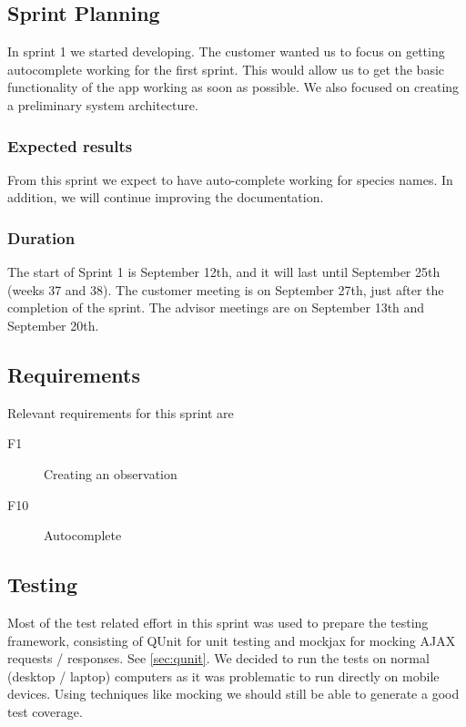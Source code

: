 \subsection{Sprint Planning}

	In sprint 1 we started developing. The customer wanted us to focus on getting autocomplete working for the first sprint. This would allow us to get the basic functionality of the app working as soon as possible. We also focused on creating a preliminary system architecture.

	\subsubsection{Expected results}
  From this sprint we expect to have auto-complete working for species names. In addition, we will continue improving the documentation.
	
	\subsubsection{Duration}
	The start of Sprint 1 is September 12th, and it will last until September 25th (weeks 37 and 38). The customer meeting is on September 27th, just after the completion of the sprint. The advisor meetings are on September 13th and September 20th.
	
\subsection{Requirements}

	Relevant requirements for this sprint are 
  \begin{description}
  \item[F1] Creating an observation
  \item[F10] Autocomplete 
  \end{description}


\subsection{Testing}

	Most of the test related effort in this sprint was used to prepare the
	testing framework, consisting of QUnit for unit testing and mockjax for
	mocking AJAX requests / responses. See \ref{sec:qunit}. We decided to run
	the tests on normal (desktop / laptop) computers as it was problematic to
	run directly on mobile devices. Using techniques like mocking we should
	still be able to generate a good test coverage.

